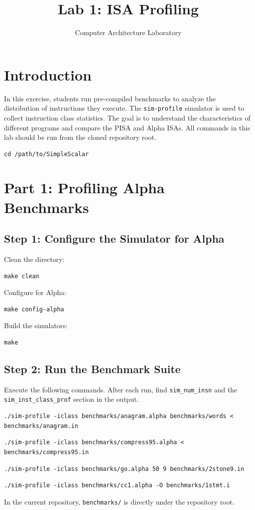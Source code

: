 \documentclass[11pt]{article}
\title{Lab 1: ISA Profiling}
\author{Computer Architecture Laboratory}
\date{}
\begin{document}
\maketitle
\section{Introduction}
In this exercise, students run pre-compiled benchmarks to analyze the distribution of instructions they execute. The \texttt{sim-profile} simulator is used to collect instruction class statistics. The goal is to understand the characteristics of different programs and compare the PISA and Alpha ISAs.
All commands in this lab should be run from the cloned repository root.
\begin{lstlisting}
cd /path/to/SimpleScalar
\end{lstlisting}
\section{Part 1: Profiling Alpha Benchmarks}
\subsection{Step 1: Configure the Simulator for Alpha}
Clean the directory:
\begin{lstlisting}
make clean
\end{lstlisting}
Configure for Alpha:
\begin{lstlisting}
make config-alpha
\end{lstlisting}
Build the simulators:
\begin{lstlisting}
make
\end{lstlisting}
\subsection{Step 2: Run the Benchmark Suite}
Execute the following commands. After each run, find \texttt{sim\_num\_insn} and the \texttt{sim\_inst\_class\_prof} section in the output.
\begin{lstlisting}
./sim-profile -iclass benchmarks/anagram.alpha benchmarks/words < benchmarks/anagram.in
\end{lstlisting}
\begin{lstlisting}
./sim-profile -iclass benchmarks/compress95.alpha < benchmarks/compress95.in
\end{lstlisting}
\begin{lstlisting}
./sim-profile -iclass benchmarks/go.alpha 50 9 benchmarks/2stone9.in
\end{lstlisting}
\begin{lstlisting}
./sim-profile -iclass benchmarks/cc1.alpha -O benchmarks/1stmt.i
\end{lstlisting}
In the current repository, \texttt{benchmarks/} is directly under the repository root.
\end{document}

